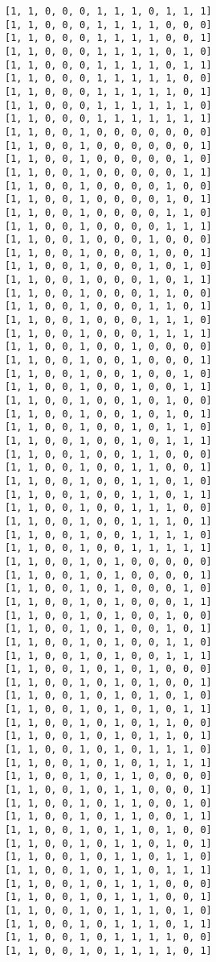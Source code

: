\documentclass[11pt]{article}
\begin{document}
\begin{Verbatim}[commandchars=\\\{\}]
[1, 1, 0, 0, 0, 1, 1, 1, 0, 1, 1, 1]
[1, 1, 0, 0, 0, 1, 1, 1, 1, 0, 0, 0]
[1, 1, 0, 0, 0, 1, 1, 1, 1, 0, 0, 1]
[1, 1, 0, 0, 0, 1, 1, 1, 1, 0, 1, 0]
[1, 1, 0, 0, 0, 1, 1, 1, 1, 0, 1, 1]
[1, 1, 0, 0, 0, 1, 1, 1, 1, 1, 0, 0]
[1, 1, 0, 0, 0, 1, 1, 1, 1, 1, 0, 1]
[1, 1, 0, 0, 0, 1, 1, 1, 1, 1, 1, 0]
[1, 1, 0, 0, 0, 1, 1, 1, 1, 1, 1, 1]
[1, 1, 0, 0, 1, 0, 0, 0, 0, 0, 0, 0]
[1, 1, 0, 0, 1, 0, 0, 0, 0, 0, 0, 1]
[1, 1, 0, 0, 1, 0, 0, 0, 0, 0, 1, 0]
[1, 1, 0, 0, 1, 0, 0, 0, 0, 0, 1, 1]
[1, 1, 0, 0, 1, 0, 0, 0, 0, 1, 0, 0]
[1, 1, 0, 0, 1, 0, 0, 0, 0, 1, 0, 1]
[1, 1, 0, 0, 1, 0, 0, 0, 0, 1, 1, 0]
[1, 1, 0, 0, 1, 0, 0, 0, 0, 1, 1, 1]
[1, 1, 0, 0, 1, 0, 0, 0, 1, 0, 0, 0]
[1, 1, 0, 0, 1, 0, 0, 0, 1, 0, 0, 1]
[1, 1, 0, 0, 1, 0, 0, 0, 1, 0, 1, 0]
[1, 1, 0, 0, 1, 0, 0, 0, 1, 0, 1, 1]
[1, 1, 0, 0, 1, 0, 0, 0, 1, 1, 0, 0]
[1, 1, 0, 0, 1, 0, 0, 0, 1, 1, 0, 1]
[1, 1, 0, 0, 1, 0, 0, 0, 1, 1, 1, 0]
[1, 1, 0, 0, 1, 0, 0, 0, 1, 1, 1, 1]
[1, 1, 0, 0, 1, 0, 0, 1, 0, 0, 0, 0]
[1, 1, 0, 0, 1, 0, 0, 1, 0, 0, 0, 1]
[1, 1, 0, 0, 1, 0, 0, 1, 0, 0, 1, 0]
[1, 1, 0, 0, 1, 0, 0, 1, 0, 0, 1, 1]
[1, 1, 0, 0, 1, 0, 0, 1, 0, 1, 0, 0]
[1, 1, 0, 0, 1, 0, 0, 1, 0, 1, 0, 1]
[1, 1, 0, 0, 1, 0, 0, 1, 0, 1, 1, 0]
[1, 1, 0, 0, 1, 0, 0, 1, 0, 1, 1, 1]
[1, 1, 0, 0, 1, 0, 0, 1, 1, 0, 0, 0]
[1, 1, 0, 0, 1, 0, 0, 1, 1, 0, 0, 1]
[1, 1, 0, 0, 1, 0, 0, 1, 1, 0, 1, 0]
[1, 1, 0, 0, 1, 0, 0, 1, 1, 0, 1, 1]
[1, 1, 0, 0, 1, 0, 0, 1, 1, 1, 0, 0]
[1, 1, 0, 0, 1, 0, 0, 1, 1, 1, 0, 1]
[1, 1, 0, 0, 1, 0, 0, 1, 1, 1, 1, 0]
[1, 1, 0, 0, 1, 0, 0, 1, 1, 1, 1, 1]
[1, 1, 0, 0, 1, 0, 1, 0, 0, 0, 0, 0]
[1, 1, 0, 0, 1, 0, 1, 0, 0, 0, 0, 1]
[1, 1, 0, 0, 1, 0, 1, 0, 0, 0, 1, 0]
[1, 1, 0, 0, 1, 0, 1, 0, 0, 0, 1, 1]
[1, 1, 0, 0, 1, 0, 1, 0, 0, 1, 0, 0]
[1, 1, 0, 0, 1, 0, 1, 0, 0, 1, 0, 1]
[1, 1, 0, 0, 1, 0, 1, 0, 0, 1, 1, 0]
[1, 1, 0, 0, 1, 0, 1, 0, 0, 1, 1, 1]
[1, 1, 0, 0, 1, 0, 1, 0, 1, 0, 0, 0]
[1, 1, 0, 0, 1, 0, 1, 0, 1, 0, 0, 1]
[1, 1, 0, 0, 1, 0, 1, 0, 1, 0, 1, 0]
[1, 1, 0, 0, 1, 0, 1, 0, 1, 0, 1, 1]
[1, 1, 0, 0, 1, 0, 1, 0, 1, 1, 0, 0]
[1, 1, 0, 0, 1, 0, 1, 0, 1, 1, 0, 1]
[1, 1, 0, 0, 1, 0, 1, 0, 1, 1, 1, 0]
[1, 1, 0, 0, 1, 0, 1, 0, 1, 1, 1, 1]
[1, 1, 0, 0, 1, 0, 1, 1, 0, 0, 0, 0]
[1, 1, 0, 0, 1, 0, 1, 1, 0, 0, 0, 1]
[1, 1, 0, 0, 1, 0, 1, 1, 0, 0, 1, 0]
[1, 1, 0, 0, 1, 0, 1, 1, 0, 0, 1, 1]
[1, 1, 0, 0, 1, 0, 1, 1, 0, 1, 0, 0]
[1, 1, 0, 0, 1, 0, 1, 1, 0, 1, 0, 1]
[1, 1, 0, 0, 1, 0, 1, 1, 0, 1, 1, 0]
[1, 1, 0, 0, 1, 0, 1, 1, 0, 1, 1, 1]
[1, 1, 0, 0, 1, 0, 1, 1, 1, 0, 0, 0]
[1, 1, 0, 0, 1, 0, 1, 1, 1, 0, 0, 1]
[1, 1, 0, 0, 1, 0, 1, 1, 1, 0, 1, 0]
[1, 1, 0, 0, 1, 0, 1, 1, 1, 0, 1, 1]
[1, 1, 0, 0, 1, 0, 1, 1, 1, 1, 0, 0]
[1, 1, 0, 0, 1, 0, 1, 1, 1, 1, 0, 1]

\end{Verbatim}
\end{document}
